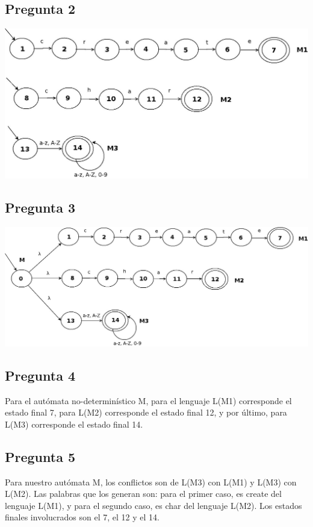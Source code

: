 \documentclass{article}
\begin{document}
\subsection{Pregunta 2}
\hspace{0.5cm} 
\includegraphics[scale=0.3]{preg2} 

\subsection{Pregunta 3}
\hspace{0.5cm}
\includegraphics[scale=0.3]{preg3} 

\subsection{Pregunta 4}
\hspace{0.5cm} Para el autómata no-determinístico M, para el lenguaje L(M1) corresponde el estado final 7, para L(M2) corresponde el estado final 12, y por último, para L(M3) corresponde el estado final 14.

\subsection{Pregunta 5}
\hspace{0.5cm} Para nuestro autómata M, los conflictos son de L(M3) con L(M1) y L(M3) con L(M2). Las palabras que los generan son: para el primer caso, es create del lenguaje L(M1), y para el segundo caso, es char del lenguaje L(M2). Los estados finales involucrados son el 7, el 12 y el 14.
\end{document}
